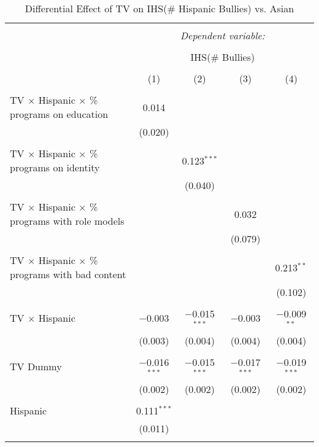 
\begin{table}[!htbp] \centering 
  \caption{Differential Effect of TV on IHS(\# Hispanic Bullies) vs. Asian} 
  \label{} 
\begin{tabular}{@{\extracolsep{-2pt}}lcccc} 
\\[-1.8ex]\hline 
\hline \\[-1.8ex] 
 & \multicolumn{4}{c}{\textit{Dependent variable:}} \\ 
\cline{2-5} 
\\[-1.8ex] & \multicolumn{4}{c}{IHS(\# Bullies)} \\ 
\\[-1.8ex] & (1) & (2) & (3) & (4)\\ 
\hline \\[-1.8ex] 
 TV $\times$ Hispanic $\times$ \% programs on education & 0.014 &  &  &  \\ 
  & (0.020) &  &  &  \\ 
  & & & & \\ 
 TV $\times$ Hispanic $\times$ \% programs on identity &  & 0.123$^{***}$ &  &  \\ 
  &  & (0.040) &  &  \\ 
  & & & & \\ 
 TV $\times$ Hispanic $\times$ \% programs with role models &  &  & 0.032 &  \\ 
  &  &  & (0.079) &  \\ 
  & & & & \\ 
 TV $\times$ Hispanic $\times$ \% programs with bad content &  &  &  & 0.213$^{**}$ \\ 
  &  &  &  & (0.102) \\ 
  & & & & \\ 
 TV $\times$ Hispanic & $-$0.003 & $-$0.015$^{***}$ & $-$0.003 & $-$0.009$^{**}$ \\ 
  & (0.003) & (0.004) & (0.004) & (0.004) \\ 
  & & & & \\ 
 TV Dummy & $-$0.016$^{***}$ & $-$0.015$^{***}$ & $-$0.017$^{***}$ & $-$0.019$^{***}$ \\ 
  & (0.002) & (0.002) & (0.002) & (0.002) \\ 
  & & & & \\ 
 Hispanic & 0.111$^{***}$ &  &  &  \\ 
  & (0.011) &  &  &  \\ 
  & & & & \\ 

\end{tabular}
\end{table}
